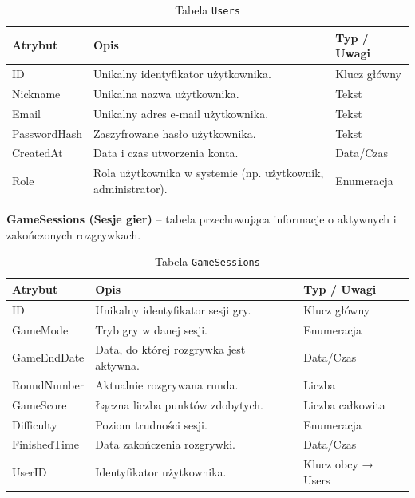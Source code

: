 \begin{table}[H]
\centering
\renewcommand{\arraystretch}{1.2}
\begin{tabular}{|p{2.5cm}|p{8cm}|p{2.5cm}|}
\hline
\textbf{Atrybut} & \textbf{Opis} & \textbf{Typ / Uwagi} \\ \hline
ID & Unikalny identyfikator użytkownika. & Klucz główny \\ \hline
Nickname & Unikalna nazwa użytkownika. & Tekst \\ \hline
Email & Unikalny adres e-mail użytkownika. & Tekst \\ \hline
PasswordHash & Zaszyfrowane hasło użytkownika. & Tekst \\ \hline
CreatedAt & Data i czas utworzenia konta. & Data/Czas \\ \hline
Role & Rola użytkownika w systemie (np. użytkownik, administrator). & Enumeracja \\ \hline
\end{tabular}
\caption{Tabela \texttt{Users}}
\end{table}

\textbf{GameSessions (Sesje gier)} – tabela przechowująca informacje o aktywnych i zakończonych rozgrywkach.

\begin{table}[H]
\centering
\renewcommand{\arraystretch}{1.2}
\begin{tabular}{|p{2.8cm}|p{8.5cm}|p{2cm}|}
\hline
\textbf{Atrybut} & \textbf{Opis} & \textbf{Typ / Uwagi} \\ \hline
ID & Unikalny identyfikator sesji gry. & Klucz główny \\ \hline
GameMode & Tryb gry w danej sesji. & Enumeracja \\ \hline
GameEndDate & Data, do której rozgrywka jest aktywna. & Data/Czas \\ \hline
RoundNumber & Aktualnie rozgrywana runda. & Liczba \\ \hline
GameScore & Łączna liczba punktów zdobytych. & Liczba całkowita \\ \hline
Difficulty & Poziom trudności sesji. & Enumeracja \\ \hline
FinishedTime & Data zakończenia rozgrywki. & Data/Czas \\ \hline
UserID & Identyfikator użytkownika. & Klucz obcy → Users \\ \hline
\end{tabular}
\caption{Tabela \texttt{GameSessions}}
\end{table}

